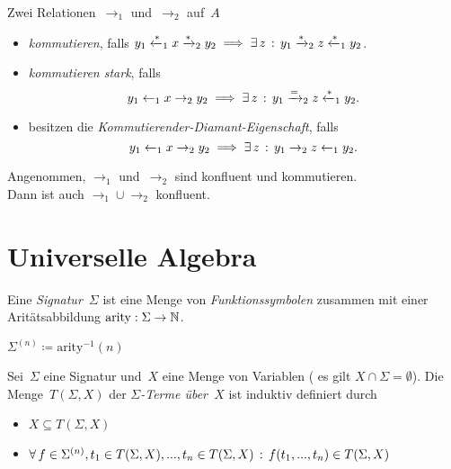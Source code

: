 \documentclass{cheat-sheet}
\newcommand{\from}{\leftarrow}
\newcommand{\reducesTo}{\xrightarrow{*}}
\newcommand{\reducesFrom}{\xleftarrow{*}}
\newcommand{\toOrEq}{\xrightarrow{=}}
\DeclareMathOperator{\arity}{arity} %
\begin{document}

\begin{defn}
  Zwei Relationen~${\to_1}$ und~${\to_2}$ auf~$A$
  \begin{itemize}
    \item \emph{kommutieren}, falls $y_1 \reducesFrom_1 x \reducesTo_2 y_2 \implies \ex{z} y_1 \reducesTo_2 z \reducesFrom_1 y_2$.
    \item \emph{kommutieren stark}, falls
    \[
      y_1 \from_1 x \to_2 y_2 \implies \ex{z} y_1 \toOrEq_2 z \reducesFrom_1 y_2.
    \]
    \item besitzen die \emph{Kommutierender-Diamant-Eigenschaft}, falls
    \[
      y_1 \from_1 x \to_2 y_2 \implies \ex{z} y_1 \to_2 z \from_1 y_2.
    \]
  \end{itemize}
\end{defn}

\begin{lem}
  Angenommen, $\to_1$ und~$\to_2$ sind konfluent und kommutieren. \\
  Dann ist auch ${\to_1} \cup {\to_2}$ konfluent.
\end{lem}

\section{Universelle Algebra}


\begin{defn}
  Eine \emph{Signatur}~$\Sigma$ ist eine Menge von \textit{Funktionssymbolen} zusammen mit einer Aritätsabbildung $\arity : \Sigma \to \N$.
\end{defn}

\begin{nota}
  $\Sigma^{(n)} \coloneqq \mathrm{arity}^{-1}(n)$
\end{nota}

\begin{defn}
  Sei~$\Sigma$ eine Signatur und~$X$ eine Menge von Variablen (\dh{} es gilt $X \cap \Sigma = \emptyset$).
  Die Menge~$T(\Sigma, X)$ der \emph{$\Sigma$-Terme über~$X$} ist induktiv definiert durch
  \begin{itemize}
    \item $X \subseteq T(\Sigma, X)$
    \item $\forall \, {f \in \Sigma^{(n)}, t_1 \in T(\Sigma, X), ..., t_n \in T(\Sigma, X)} \,:\, f(t_1, ..., t_n) \in T(\Sigma, X)$
  \end{itemize}
\end{defn}
\end{document}
